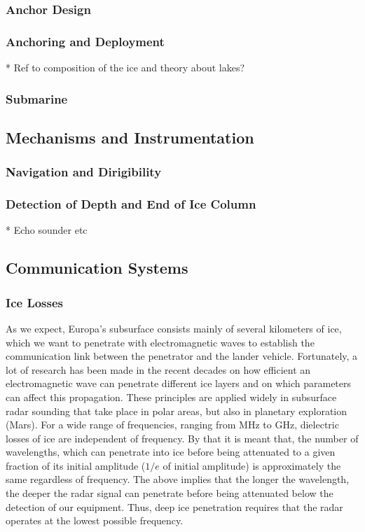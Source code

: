 \documentclass{book}
\begin{document}
\subsubsection{Anchor Design}

\subsubsection{Anchoring and Deployment}

* Ref to composition of the ice and theory about lakes?

\subsubsection{Submarine}

\subsection{Mechanisms and Instrumentation}

\subsubsection{Navigation and Dirigibility}

\subsubsection{Detection of Depth and End of Ice Column}

* Echo sounder etc

\subsection{Communication Systems}


\subsubsection{Ice Losses}
As we expect, Europa's subsurface consists mainly of several kilometers of ice, which we want to penetrate with electromagnetic waves to establish the communication link between the penetrator and the lander vehicle. Fortunately, a lot of research has been made in the recent decades on how efficient an electromagnetic wave can penetrate different ice layers and on which parameters can affect this propagation. These principles are applied widely in subsurface radar sounding that take place in polar areas, but also in planetary exploration (Mars). For a wide range of frequencies, ranging from MHz to GHz, dielectric losses of ice are independent of frequency. By that it is meant that, the number of wavelengths, which can penetrate into ice before being attenuated to a given fraction of its initial amplitude ($1/e$ of initial amplitude) is approximately the same regardless of frequency. The above implies that the longer the wavelength, the deeper the radar signal can penetrate before being attenuated below the detection of our equipment. Thus, deep ice penetration requires that the radar operates at the lowest possible frequency. 
\end{document}
